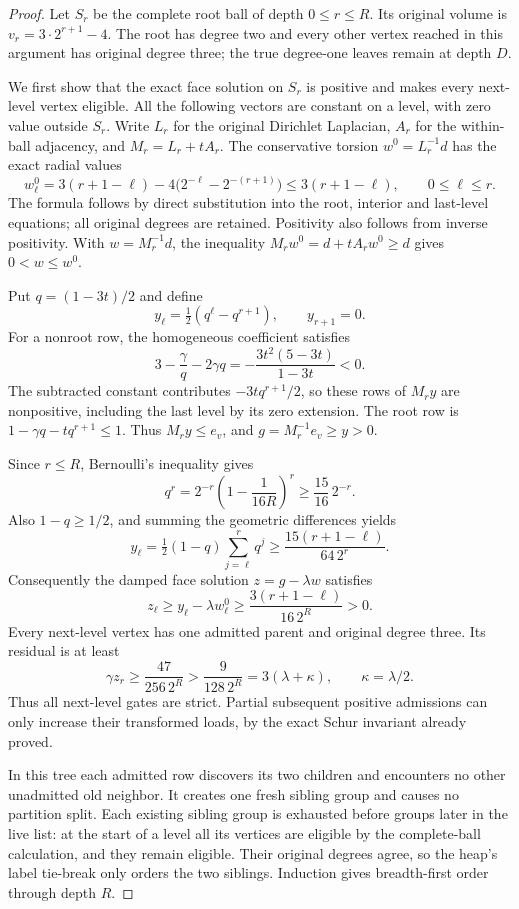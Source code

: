 \begin{proof}
Let $S_r$ be the complete root ball of depth $0\leq r\leq R$. Its
original volume is $v_r=3\cdot2^{r+1}-4$. The root has degree two and
every other vertex reached in this argument has original degree three;
the true degree-one leaves remain at depth $D$.

We first show that the exact face solution on $S_r$ is positive and makes
every next-level vertex eligible. All the following vectors are constant
on a level, with zero value outside $S_r$. Write $L_r$ for the original
Dirichlet Laplacian, $A_r$ for the within-ball adjacency, and
$M_r=L_r+tA_r$. The conservative torsion $w^0=L_r^{-1}d$ has the exact
radial values
\[
 w^0_\ell=3(r+1-\ell)
       -4\bigl(2^{-\ell}-2^{-(r+1)}\bigr)
 \leq3(r+1-\ell),\qquad 0\leq\ell\leq r.
\]
The formula follows by direct substitution into the root, interior and
last-level equations; all original degrees are retained. Positivity also
follows from inverse positivity. With $w=M_r^{-1}d$, the inequality
$M_rw^0=d+tA_rw^0\geq d$ gives $0<w\leq w^0$.

Put $q=(1-3t)/2$ and define
\[
 y_\ell=\tfrac12(q^\ell-q^{r+1}),\qquad y_{r+1}=0.
\]
For a nonroot row, the homogeneous coefficient satisfies
\[
 3-\frac\gamma q-2\gamma q
 =-\frac{3t^2(5-3t)}{1-3t}<0.
\]
The subtracted constant contributes $-3tq^{r+1}/2$, so these rows of
$M_ry$ are nonpositive, including the last level by its zero extension.
The root row is $1-\gamma q-tq^{r+1}\leq1$. Thus $M_ry\leq e_v$,
and $g=M_r^{-1}e_v\geq y>0$.

Since $r\leq R$, Bernoulli's inequality gives
\[
 q^r=2^{-r}\left(1-\frac1{16R}\right)^r
 \geq\frac{15}{16}\,2^{-r}.
\]
Also $1-q\geq1/2$, and summing the geometric differences yields
\[
 y_\ell=\tfrac12(1-q)\sum_{j=\ell}^r q^j
 \geq\frac{15(r+1-\ell)}{64\,2^r}.
\]
Consequently the damped face solution $z=g-\lambda w$ satisfies
\[
 z_\ell\geq y_\ell-\lambda w^0_\ell
 \geq\frac{3(r+1-\ell)}{16\,2^R}>0.
\]
Every next-level vertex has one admitted parent and original degree three.
Its residual is at least
\[
 \gamma z_r\geq\frac{47}{256\,2^R}
 >\frac9{128\,2^R}=3(\lambda+\kappa),
 \qquad \kappa=\lambda/2.
\]
Thus all next-level gates are strict. Partial subsequent positive
admissions can only increase their transformed loads, by the exact Schur
invariant already proved.

In this tree each admitted row discovers its two children and encounters
no other unadmitted old neighbor. It creates one fresh sibling group and
causes no partition split. Each existing sibling group is exhausted before
groups later in the live list: at the start of a level all its vertices
are eligible by the complete-ball calculation, and they remain eligible.
Their original degrees agree, so the heap's label tie-break only orders
the two siblings. Induction gives breadth-first order through depth $R$.


\end{proof}
